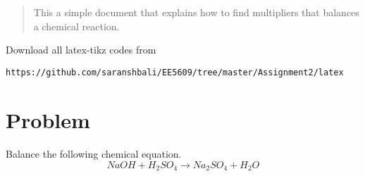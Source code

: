 \documentclass[journal,12pt,twocolumn]{IEEEtran}
\begin{document}
%
\begin{abstract}
This a simple document that explains how to find multipliers that balances a chemical reaction.
\end{abstract}
%
%
Download all latex-tikz codes from 
%
\begin{lstlisting}
https://github.com/saranshbali/EE5609/tree/master/Assignment2/latex
\end{lstlisting}
%
\section{Problem}
Balance the following chemical equation.
\begin{equation*}
NaOH + H_2SO_4 \xrightarrow{} Na_2SO_4  +  H_2O
\end{equation*}
\end{document}
